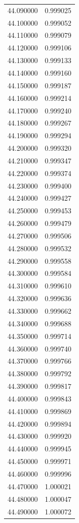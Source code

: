 \begin{tabular}{rr}
44.090000 & 0.999025 \\
44.100000 & 0.999052 \\
44.110000 & 0.999079 \\
44.120000 & 0.999106 \\
44.130000 & 0.999133 \\
44.140000 & 0.999160 \\
44.150000 & 0.999187 \\
44.160000 & 0.999214 \\
44.170000 & 0.999240 \\
44.180000 & 0.999267 \\
44.190000 & 0.999294 \\
44.200000 & 0.999320 \\
44.210000 & 0.999347 \\
44.220000 & 0.999374 \\
44.230000 & 0.999400 \\
44.240000 & 0.999427 \\
44.250000 & 0.999453 \\
44.260000 & 0.999479 \\
44.270000 & 0.999506 \\
44.280000 & 0.999532 \\
44.290000 & 0.999558 \\
44.300000 & 0.999584 \\
44.310000 & 0.999610 \\
44.320000 & 0.999636 \\
44.330000 & 0.999662 \\
44.340000 & 0.999688 \\
44.350000 & 0.999714 \\
44.360000 & 0.999740 \\
44.370000 & 0.999766 \\
44.380000 & 0.999792 \\
44.390000 & 0.999817 \\
44.400000 & 0.999843 \\
44.410000 & 0.999869 \\
44.420000 & 0.999894 \\
44.430000 & 0.999920 \\
44.440000 & 0.999945 \\
44.450000 & 0.999971 \\
44.460000 & 0.999996 \\
44.470000 & 1.000021 \\
44.480000 & 1.000047 \\
44.490000 & 1.000072 \\

\end{tabular}
